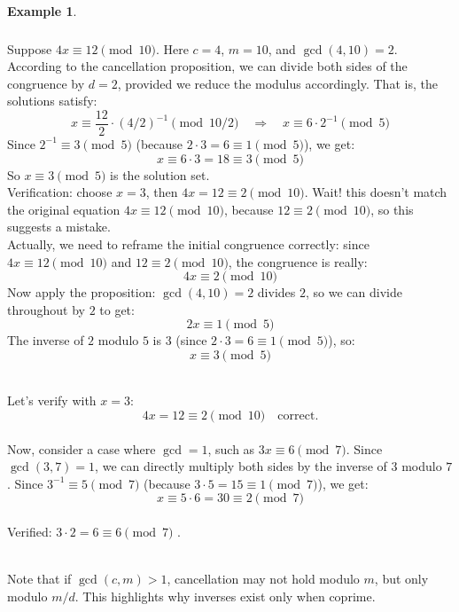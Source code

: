 \documentclass[12pt,openany]{book}
\theoremstyle{definition}
\newtheorem{example}{Example}[chapter]
\theoremstyle{plain}
\theoremstyle{remark}
\begin{document}
\begin{example}\subsubsection*{}
  Suppose $4x \equiv 12 \pmod{10}$. Here $c = 4$, $m = 10$, and $\gcd(4, 10) = 2$. According to the cancellation proposition, we can divide both sides of the congruence by $d = 2$, provided we reduce the modulus accordingly. That is, the solutions satisfy:
  \[
    x \equiv \frac{12}{2} \cdot (4/2)^{-1} \pmod{10/2} \quad \Rightarrow \quad x \equiv 6 \cdot 2^{-1} \pmod{5}
  \]
  Since $2^{-1} \equiv 3 \pmod{5}$ (because $2 \cdot 3 = 6 \equiv 1 \pmod{5}$), we get:
  \[
    x \equiv 6 \cdot 3 = 18 \equiv 3 \pmod{5}
  \]
  So $x \equiv 3 \pmod{5}$ is the solution set.
  \medskip
  \noindent
  \\
  Verification: choose $x = 3$, then $4x = 12 \equiv 2 \pmod{10}$. Wait! this doesn't match the original equation $4x \equiv 12 \pmod{10}$, because $12 \equiv 2 \pmod{10}$, so this suggests a mistake.
  \noindent
  \\
  Actually, we need to reframe the initial congruence correctly: since $4x \equiv 12 \pmod{10}$ and $12 \equiv 2 \pmod{10}$, the congruence is really:
  \[
    4x \equiv 2 \pmod{10}
  \]
  Now apply the proposition: $\gcd(4, 10) = 2$ divides $2$, so we can divide throughout by $2$ to get:
  \[
    2x \equiv 1 \pmod{5}
  \]
  The inverse of $2$ modulo $5$ is $3$ (since $2 \cdot 3 = 6 \equiv 1 \pmod{5}$), so:
  \[
    x \equiv 3 \pmod{5}
  \]

  \medskip
  \noindent
  \\
  Let's verify with $x = 3$:
  \[
    4x = 12 \equiv 2 \pmod{10} \quad \text{correct}.
  \]
  \medskip
  \noindent
  \\
  Now, consider a case where $\gcd = 1$, such as $3x \equiv 6 \pmod{7}$. Since $\gcd(3, 7) = 1$, we can directly multiply both sides by the inverse of $3$ modulo $7$. Since $3^{-1} \equiv 5 \pmod{7}$ (because $3 \cdot 5 = 15 \equiv 1 \pmod{7}$), we get:
  \[
    x \equiv 5 \cdot 6 = 30 \equiv 2 \pmod{7}
  \]
  \noindent
  \\
  Verified: $3 \cdot 2 = 6 \equiv 6 \pmod{7}$ .
\end{example}
\noindent
\\
Note that if $\gcd(c,m)>1$, cancellation may not hold modulo $m$, but only modulo $m/d$. This highlights why inverses exist only when coprime.
\end{document}
